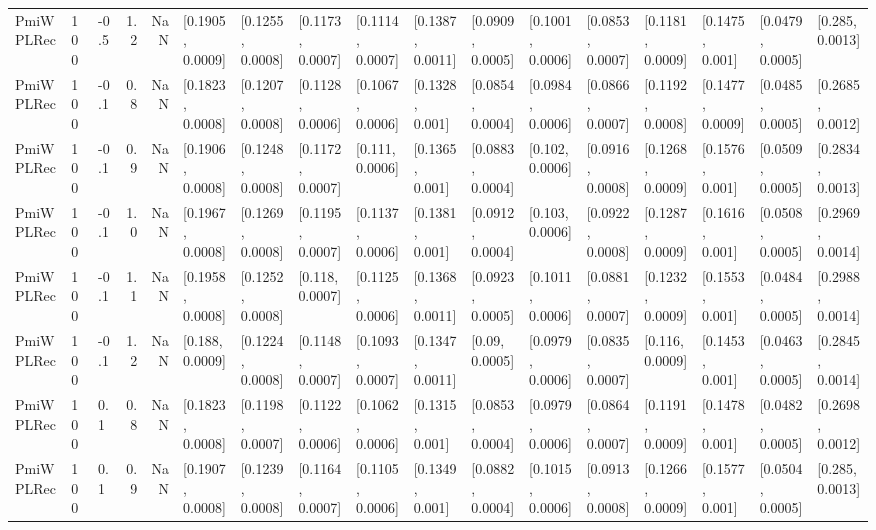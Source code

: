 \begin{tabular}{lllrrllllllllllll}
 PmiWPLRec &  100 &  -0.5 &   1.2 &   NaN &  [0.1905, 0.0009] &  [0.1255, 0.0008] &  [0.1173, 0.0007] &  [0.1114, 0.0007] &  [0.1387, 0.0011] &  [0.0909, 0.0005] &  [0.1001, 0.0006] &  [0.0853, 0.0007] &  [0.1181, 0.0009] &   [0.1475, 0.001] &  [0.0479, 0.0005] &   [0.285, 0.0013] \\
 PmiWPLRec &  100 &  -0.1 &   0.8 &   NaN &  [0.1823, 0.0008] &  [0.1207, 0.0008] &  [0.1128, 0.0006] &  [0.1067, 0.0006] &   [0.1328, 0.001] &  [0.0854, 0.0004] &  [0.0984, 0.0006] &  [0.0866, 0.0007] &  [0.1192, 0.0008] &  [0.1477, 0.0009] &  [0.0485, 0.0005] &  [0.2685, 0.0012] \\
 PmiWPLRec &  100 &  -0.1 &   0.9 &   NaN &  [0.1906, 0.0008] &  [0.1248, 0.0008] &  [0.1172, 0.0007] &   [0.111, 0.0006] &   [0.1365, 0.001] &  [0.0883, 0.0004] &   [0.102, 0.0006] &  [0.0916, 0.0008] &  [0.1268, 0.0009] &   [0.1576, 0.001] &  [0.0509, 0.0005] &  [0.2834, 0.0013] \\
 PmiWPLRec &  100 &  -0.1 &   1.0 &   NaN &  [0.1967, 0.0008] &  [0.1269, 0.0008] &  [0.1195, 0.0007] &  [0.1137, 0.0006] &   [0.1381, 0.001] &  [0.0912, 0.0004] &   [0.103, 0.0006] &  [0.0922, 0.0008] &  [0.1287, 0.0009] &   [0.1616, 0.001] &  [0.0508, 0.0005] &  [0.2969, 0.0014] \\
 PmiWPLRec &  100 &  -0.1 &   1.1 &   NaN &  [0.1958, 0.0008] &  [0.1252, 0.0008] &   [0.118, 0.0007] &  [0.1125, 0.0006] &  [0.1368, 0.0011] &  [0.0923, 0.0005] &  [0.1011, 0.0006] &  [0.0881, 0.0007] &  [0.1232, 0.0009] &   [0.1553, 0.001] &  [0.0484, 0.0005] &  [0.2988, 0.0014] \\
 PmiWPLRec &  100 &  -0.1 &   1.2 &   NaN &   [0.188, 0.0009] &  [0.1224, 0.0008] &  [0.1148, 0.0007] &  [0.1093, 0.0007] &  [0.1347, 0.0011] &    [0.09, 0.0005] &  [0.0979, 0.0006] &  [0.0835, 0.0007] &   [0.116, 0.0009] &   [0.1453, 0.001] &  [0.0463, 0.0005] &  [0.2845, 0.0014] \\
 PmiWPLRec &  100 &   0.1 &   0.8 &   NaN &  [0.1823, 0.0008] &  [0.1198, 0.0007] &  [0.1122, 0.0006] &  [0.1062, 0.0006] &   [0.1315, 0.001] &  [0.0853, 0.0004] &  [0.0979, 0.0006] &  [0.0864, 0.0007] &  [0.1191, 0.0009] &   [0.1478, 0.001] &  [0.0482, 0.0005] &  [0.2698, 0.0012] \\
 PmiWPLRec &  100 &   0.1 &   0.9 &   NaN &  [0.1907, 0.0008] &  [0.1239, 0.0008] &  [0.1164, 0.0007] &  [0.1105, 0.0006] &   [0.1349, 0.001] &  [0.0882, 0.0004] &  [0.1015, 0.0006] &  [0.0913, 0.0008] &  [0.1266, 0.0009] &   [0.1577, 0.001] &  [0.0504, 0.0005] &   [0.285, 0.0013] \\

\end{tabular}
